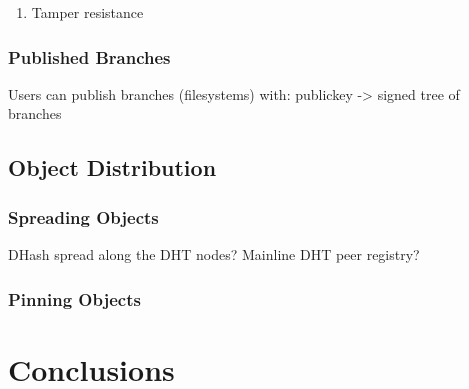 \documentclass{sig-alternate}
\begin{document}
\begin{enumerate}
  \item Tamper resistance
\end{enumerate}

\subsubsection{Published Branches}

Users can publish branches (filesystems) with:
publickey -> signed tree of branches


\subsection{Object Distribution}

\subsubsection{Spreading Objects}

DHash spread along the DHT nodes?
Mainline DHT peer registry?

\subsubsection{Pinning Objects}


\section{Conclusions}






%
%
\end{document}
